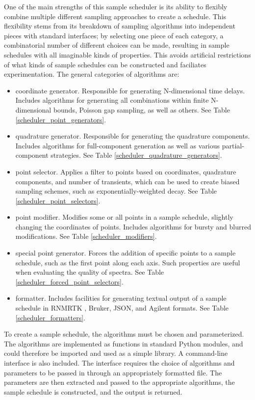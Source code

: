 One of the main strengths of this sample scheduler is its ability to flexibly
combine multiple different sampling approaches to create a schedule.  This
flexibility stems from its breakdown of sampling algorithms into independent
pieces with standard interfaces; by selecting one piece of each category, 
a combinatorial number of different choices can be made, resulting in sample
schedules with all imaginable kinds of properties.  This avoids artificial
restrictions of what kinds of sample schedules can be constructed and
faciliates experimentation.  The general categories of algorithms are:
\begin{itemize}
  \item coordinate generator.  Responsible for generating N-dimensional time
    delays.  Includes algorithms for generating all combinations within finite
    N-dimensional bounds, Poisson gap \cite{poissongap} sampling, as well
    as others.  See Table \ref{scheduler_point_generators}.
  \item quadrature generator.  Responsible for generating the quadrature
    components.  Includes algorithms for full-component generation as well
    as various partial-component strategies.
    See Table \ref{scheduler_quadrature_generators}.
  \item point selector.  Applies a filter to points based on coordinates,
    quadrature components, and number of transients, which can be used to create
    biased sampling schemes, such as exponentially-weighted decay.
    See Table \ref{scheduler_point_selectors}.
  \item point modifier.  Modifies some or all points in a sample schedule, 
    slightly changing the coordinates of points.  Includes algorithms for
    bursty \cite{maciejewski2009nonuniform} and blurred 
    \cite{hoch2008randomization} modifications.
    See Table \ref{scheduler_modifiers}.
  \item special point generator.  Forces the addition of specific points to
    a sample schedule, such as the first point along each axis.  Such properties
    are useful when evaluating the quality of spectra.
    See Table \ref{scheduler_forced_point_selectors}.
  \item formatter.  Includes facilities for generating textual output of a 
    sample schedule in RNMRTK \cite{rnmrtk}, Bruker, JSON, and Agilent formats.
    See Table \ref{scheduler_formatters}.
\end{itemize}
To create a sample schedule, the algorithms must be chosen and parameterized.
The algorithms are implemented as functions in standard Python modules, 
and could therefore be imported and used as a simple library.
A command-line interface is also included.  The interface requires the choice 
of algorithms and parameters to be passed in through an appropriately
formatted file.  The parameters are then extracted and passed to the appropriate
algorithms, the sample schedule is constructed, and the output is returned. 

